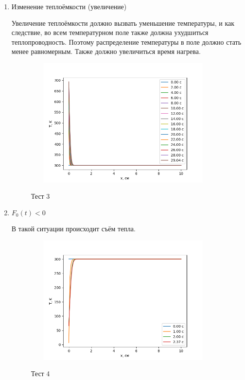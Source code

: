 \begin{enumerate}
\begin{enumerate}
\newpage

	\item Изменение теплоёмкости (увеличение)

	Увеличение теплоёмкости должно вызвать уменьшение температуры, и как следствие, во всем температурном поле также должна ухудшиться теплопроводность. Поэтому распределение температуры в поле должно стать менее равномерным. Также должно увеличиться время нагрева. 
	\begin{figure}[h]
		\begin{center}
			{\includegraphics[height=6.5cm, width = 10cm]{../pictures/Figure_6}}
			\caption{Тест 3}
		\end{center}
	\end{figure}

\newpage

	\item $F_0(t) < 0$
	
	В такой ситуации происходит съём тепла.
	\begin{figure}[h]
		\begin{center}
			{\includegraphics[height=6.5cm, width = 10cm]{../pictures/Figure_4}}
			\caption{Тест 4}
		\end{center}
	\end{figure}

	
\end{enumerate}
\end{enumerate}








